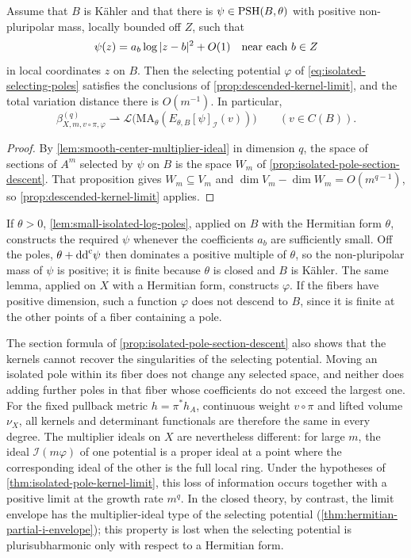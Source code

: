 \begin{theorem}\label{thm:isolated-pole-kernel-limit}
Assume that $B$ is K\"ahler and that there is $\psi\in\mathrm{PSH}(B,\theta)$ with positive non-pluripolar mass, locally bounded off $Z$, such that
\[
 \psi(z)=a_b\log|z-b|^2+O(1)\quad\hbox{near each }b\in Z
\]
in local coordinates $z$ on $B$. Then the selecting potential $\varphi$ of \eqref{eq:isolated-selecting-poles} satisfies the conclusions of \cref{prop:descended-kernel-limit}, and the total variation distance there is $O(m^{-1})$. In particular,
\[
 \beta_{X,m,v\circ\pi,\varphi}^{(q)}
      \rightharpoonup\mathcal L\bigl(\mathrm{MA}_\theta(E_{\theta,B}[\psi]_{\mathcal I}(v))\bigr)
 \qquad(v\in C(B)).
\]
\end{theorem}
\begin{proof}
By \cref{lem:smooth-center-multiplier-ideal} in dimension $q$, the space of sections of $A^m$ selected by $\psi$ on $B$ is the space $W_m$ of \cref{prop:isolated-pole-section-descent}. That proposition gives $W_m\subseteq V_m$ and $\dim V_m-\dim W_m=O(m^{q-1})$, so \cref{prop:descended-kernel-limit} applies.
\end{proof}

If $\theta>0$, \cref{lem:small-isolated-log-poles}, applied on $B$ with the Hermitian form $\theta$, constructs the required $\psi$ whenever the coefficients $a_b$ are sufficiently small. Off the poles, $\theta+\mathrm{dd}^{\mathrm{c}}\psi$ then dominates a positive multiple of $\theta$, so the non-pluripolar mass of $\psi$ is positive; it is finite because $\theta$ is closed and $B$ is K\"ahler. The same lemma, applied on $X$ with a Hermitian form, constructs $\varphi$. If the fibers have positive dimension, such a function $\varphi$ does not descend to $B$, since it is finite at the other points of a fiber containing a pole.

The section formula of \cref{prop:isolated-pole-section-descent} also shows that the kernels cannot recover the singularities of the selecting potential. Moving an isolated pole within its fiber does not change any selected space, and neither does adding further poles in that fiber whose coefficients do not exceed the largest one. For the fixed pullback metric $h=\pi^*h_A$, continuous weight $v\circ\pi$ and lifted volume $\nu_X$, all kernels and determinant functionals are therefore the same in every degree. The multiplier ideals on $X$ are nevertheless different: for large $m$, the ideal $\mathcal I(m\varphi)$ of one potential is a proper ideal at a point where the corresponding ideal of the other is the full local ring. Under the hypotheses of \cref{thm:isolated-pole-kernel-limit}, this loss of information occurs together with a positive limit at the growth rate $m^q$. In the closed theory, by contrast, the limit envelope has the multiplier-ideal type of the selecting potential (\cref{thm:hermitian-partial-i-envelope}); this property is lost when the selecting potential is plurisubharmonic only with respect to a Hermitian form.
